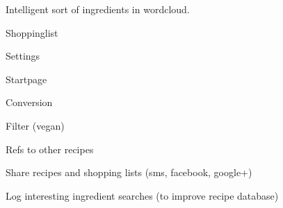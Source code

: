 Intelligent sort of ingredients in wordcloud.

Shoppinglist

Settings

Startpage

Conversion

Filter (vegan)

Refs to other recipes

Share recipes and shopping lists (sms, facebook, google+)

Log interesting ingredient searches (to improve recipe database)